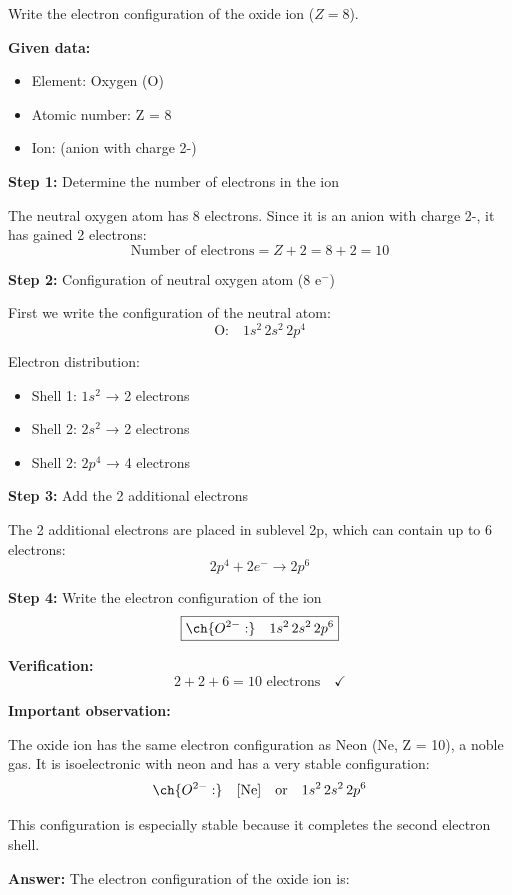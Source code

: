 \begin{exercise}
    Write the electron configuration of the oxide ion  (\( Z = 8 \)).
    \begin{solu}
        \textbf{Given data:}
        \begin{itemize}
            \item Element: Oxygen (O)
            \item Atomic number: Z = 8
            \item Ion:  (anion with charge 2-)
        \end{itemize}

        \textbf{Step 1:} Determine the number of electrons in the ion

        The neutral oxygen atom has 8 electrons. Since it is an anion with charge 2-, it has gained 2 electrons:
        \[
            \text{Number of electrons} = Z + 2 = 8 + 2 = 10
        \]

        \textbf{Step 2:} Configuration of neutral oxygen atom (8 e\(^-\))

        First we write the configuration of the neutral atom:
        \[
            \text{O:} \quad 1s^2 \, 2s^2 \, 2p^4
        \]

        Electron distribution:
        \begin{itemize}
            \item Shell 1: \(1s^2\) → 2 electrons
            \item Shell 2: \(2s^2\) → 2 electrons
            \item Shell 2: \(2p^4\) → 4 electrons
        \end{itemize}

        \textbf{Step 3:} Add the 2 additional electrons

        The 2 additional electrons are placed in sublevel 2p, which can contain up to 6 electrons:
        \[
            2p^4 + 2e^- \rightarrow 2p^6
        \]

        \textbf{Step 4:} Write the electron configuration of the ion
        \[
            \boxed{\ch{O^{2-}:} \quad 1s^2 \, 2s^2 \, 2p^6}
        \]

        \textbf{Verification:}
        \[
            2 + 2 + 6 = 10 \text{ electrons} \quad \checkmark
        \]

        \textbf{Important observation:}

        The oxide ion  has the same electron configuration as Neon (Ne, Z = 10), a noble gas. It is isoelectronic with neon and has a very stable configuration:
        \[
            \ch{O^{2-}:} \quad [\text{Ne}] \quad \text{or} \quad 1s^2 \, 2s^2 \, 2p^6
        \]

        This configuration is especially stable because it completes the second electron shell.

        \textbf{Answer:} The electron configuration of the oxide ion is: 
    \end{solu}
\end{exercise}
